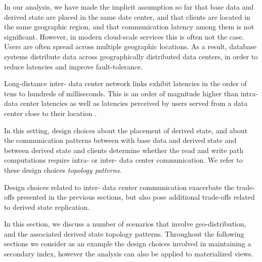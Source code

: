 
In our analysis, we have made the implicit assumption so far that base data and derived state are placed in the
same date center, and that clients are located in the same geographic region,
and that communication latency among them is not significant.
However, in modern cloud-scale services this is often not the case.
Users are often spread across multiple geographic locations.
As a result, database systems distribute data across geographically distributed data centers,
in order to reduce latencies and improve fault-tolerance.

Long-distance inter- data center network links exhibit latencies in the order of tens to hundreds of milliseconds.
This is an order of magnitude higher than intra- data center latencies as well as latencies perceived by users served
from a data center close to their location \cite{kleppmann:localfirst}.

In this setting, design choices about the placement of derived state,
and about the communication patterns between with base data and derived state and between derived state and clients
determine whether the read and write path computations require intra- or inter- data center communication.
We refer to these design choices \textit{topology patterns}.

Design choices related to inter- data center communication exacerbate the trade-offs presented in the previous sections,
but also pose additional trade-offs related to derived state replication.

In this section, we discuss a number of scenarios that involve geo-distribution, and the associated derived state
topology patterns.
Throughout the following sections we consider as an example the design choices involved in maintaining a secondary index,
however the analysis can also be applied to materialized views.

